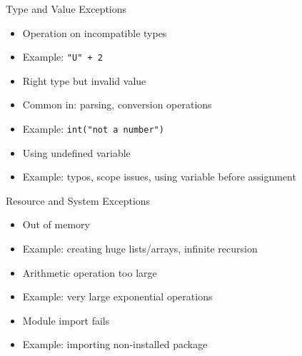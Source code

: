 \documentclass[aspectratio=169]{beamer}
\begin{document}
\begin{frame}{Type and Value Exceptions}
    \begin{itemize}[<2->]
        \item Operation on incompatible types
        \item Example: \texttt{"U" + 2}
    \end{itemize}

    \begin{itemize}[<5->]
        \item Right type but invalid value
        \item Common in: parsing, conversion operations
        \item Example: \texttt{int("not a number")}
    \end{itemize}

    \begin{itemize}[<9->]
        \item Using undefined variable
        \item Example: typos, scope issues, using variable before assignment
    \end{itemize}
\end{frame}

\begin{frame}{Resource and System Exceptions}
    \begin{itemize}[<2->]
        \item Out of memory
        \item Example: creating huge lists/arrays, infinite recursion
    \end{itemize}

    \begin{itemize}[<5->]
        \item Arithmetic operation too large
        \item Example: very large exponential operations
    \end{itemize}

    \begin{itemize}[<8->]
        \item Module import fails
        \item Example: importing non-installed package
    \end{itemize}
\end{frame}
\end{document}

